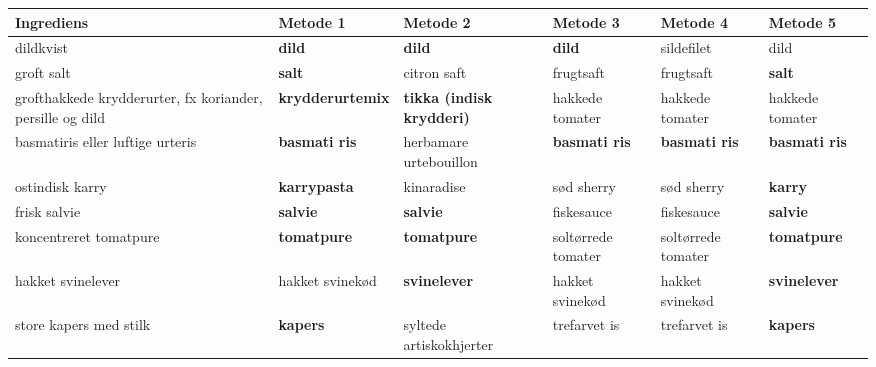 \begin{table}
  \center
    \begin{tabular}{|p{2cm}|p{2cm}|p{2cm}|p{2cm}|p{2cm}|p{2cm}|}
        \hline
        Ingrediens                                                 & Metode 1        & Metode 2                & Metode 3           & Metode 4           & Metode 5        \\ \hline
        dildkvist                                                  & \textbf{dild}            & \textbf{dild}                    & \textbf{dild}               & sildefilet         & dild            \\ \hline
        groft salt                                                 & \textbf{salt}            & citron saft             & frugtsaft          & frugtsaft          & \textbf{salt}            \\ \hline
        grofthakkede krydderurter, fx koriander, persille og dild & \textbf{krydderurtemix}  & \textbf{tikka (indisk krydderi)} & hakkede tomater    & hakkede tomater    & hakkede tomater \\ \hline
        basmatiris eller luftige urteris                           & \textbf{basmati ris}     & herbamare urtebouillon  & \textbf{basmati ris}        & \textbf{basmati ris}        & \textbf{basmati ris}     \\ \hline
        ostindisk karry                                            & \textbf{karrypasta}      & kinaradise              & sød sherry         & sød sherry         & \textbf{karry}           \\ \hline
        frisk salvie                                               & \textbf{salvie}          & \textbf{salvie}                  & fiskesauce         & fiskesauce         & \textbf{salvie}          \\ \hline
        koncentreret tomatpure                                     & \textbf{tomatpure}       & \textbf{tomatpure}               & soltørrede tomater & soltørrede tomater & \textbf{tomatpure}       \\ \hline
        hakket svinelever                                          & hakket svinekød & \textbf{svinelever}              & hakket svinekød    & hakket svinekød    & \textbf{svinelever}      \\ \hline
        store kapers med stilk                                     & \textbf{kapers}          & syltede artiskokhjerter & trefarvet is       & trefarvet is       & \textbf{kapers}          \\ \hline

\end{tabular}
\end{table}
